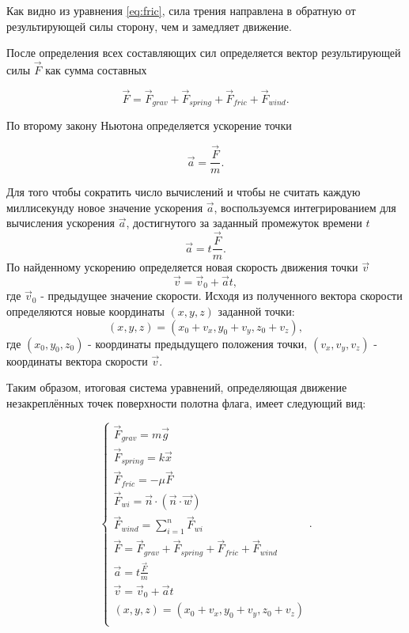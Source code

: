 Как видно из уравнения \ref{eq:fric}, сила трения направлена в обратную от результирующей силы сторону, чем и замедляет движение.

\vspace{0.3cm}После определения всех составляющих сил определяется вектор результирующей силы $\vec{F}$ как сумма составных

\begin{equation}
\vec{F} = \vec{F}_{grav} + \vec{F}_{spring} + \vec{F}_{fric} + \vec{F}_{wind}.
\end{equation}

По второму закону Ньютона определяется ускорение точки

\begin{equation}
\displaystyle \vec{a} = \frac{\vec{F}}{m}.
\label{eq:accel}
\end{equation}

\vspace{0.3cm}Для того чтобы сократить число вычислений и чтобы не считать каждую миллисекунду новое значение ускорения $\vec{a}$, воспользуемся интегрированием для вычисления ускорения $\vec{a}$, достигнутого за заданный промежуток времени $t$
\begin{equation}
\displaystyle \vec{a} = t\frac{\vec{F}}{m}.
\end{equation}
По найденному ускорению определяется новая скорость движения точки $\vec{v}$
\begin{equation}
\vec{v} = \vec{v}_{0} + \vec{a}t,
\end{equation}
где $\vec{v}_{0}$ - предыдущее значение скорости.
Исходя из полученного вектора скорости определяются новые координаты $(x, y, z)$ заданной точки:
\begin{equation}
(x, y, z) = (x_{0} + v_{x}, y_{0} + v_{y}, z_{0} + v_{z}) ,
\end{equation}
где $(x_{0}, y_{0}, z_{0})$ - координаты предыдущего положения точки,
$(v_{x}, v_{y}, v_{z})$ - координаты вектора скорости $\vec{v}$.

\vspace{0.3cm}Таким образом, итоговая система уравнений, определяющая движение незакреплённых точек поверхности полотна флага, имеет следующий вид:

\begin{equation}
\begin{cases}
\vec{F}_{grav} = m\vec{g}\\
\vec{F}_{spring} = k\vec{x}\\
\vec{F}_{fric} = -\mu\vec{F}\\
\vec{F}_{wi} = \vec{n} \cdot (\vec{n} \cdot \vec{w})\\
\vec{F}_{wind} = \sum\limits_{i=1}^n \vec{F}_{wi}\\
\vec{F} = \vec{F}_{grav} + \vec{F}_{spring} + \vec{F}_{fric} + \vec{F}_{wind}\\
\displaystyle \vec{a} = t\frac{\vec{F}}{m}\\
\vec{v} = \vec{v}_{0} + \vec{a}t\\
(x, y, z) = (x_{0} + v_{x}, y_{0} + v_{y}, z_{0} + v_{z})\\
\end{cases}.
\label{eq:sys}
\end{equation}

